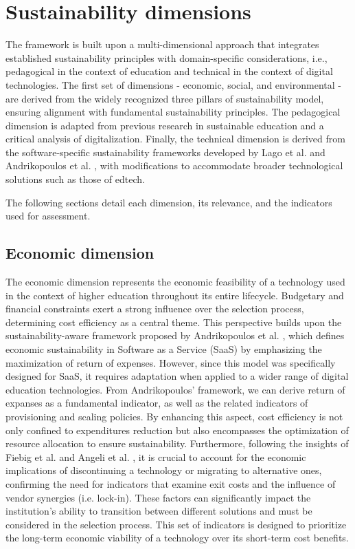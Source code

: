 \section{Sustainability dimensions}
\label{sec:3.4_sustainability_dimensions}
The framework is built upon a multi-dimensional approach that integrates established sustainability principles with domain-specific considerations, i.e., pedagogical in the context of education and technical in the context of digital technologies. The first set of dimensions - economic, social, and environmental - are derived from the widely recognized three pillars of sustainability model, ensuring alignment with fundamental sustainability principles. The pedagogical dimension is adapted from previous research in sustainable education and a critical analysis of digitalization. Finally, the technical dimension is derived from the software-specific sustainability frameworks developed by Lago et al. \cite{lago_framing_2015} and Andrikopoulos et al. \cite{andrikopoulos_software_2021}, with modifications to accommodate broader technological solutions such as those of edtech. 

The following sections detail each dimension, its relevance, and the indicators used for assessment.

\subsection{Economic dimension}
The economic dimension represents the economic feasibility of a technology used in the context of higher education throughout its entire lifecycle. Budgetary and financial constraints exert a strong influence over the selection process, determining cost efficiency as a central theme.
This perspective builds upon the sustainability-aware framework proposed by Andrikopoulos et al. \cite{andrikopoulos_software_2021}, which defines economic sustainability in Software as a Service (SaaS) by emphasizing the maximization of return of expenses. However, since this model was specifically designed for SaaS, it requires adaptation when applied to a wider range of digital education technologies.
From Andrikopoulos’ framework, we can derive return of expanses as a fundamental indicator, as well as the related indicators of provisioning and scaling policies. By enhancing this aspect, cost efficiency is not only confined to expenditures reduction but also encompasses the optimization of resource allocation to ensure sustainability.
Furthermore, following the insights of Fiebig et al. \cite{fiebig_heads_2023} and Angeli et al. \cite{angeli_conceptualising_2022}, it is crucial to account for the economic implications of discontinuing a technology or migrating to alternative ones, confirming the need for indicators that examine exit costs and the influence of vendor synergies (i.e. lock-in). These factors can significantly impact the institution's ability to transition between different solutions and must be considered in the selection process.
This set of indicators is designed to prioritize the long-term economic viability of a technology over its short-term cost benefits.

